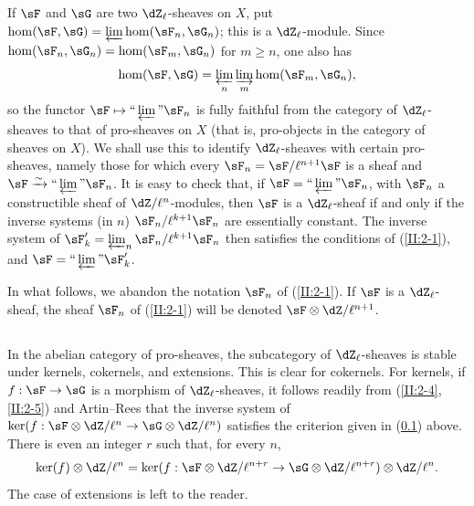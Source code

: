 \documentclass[12pt,oneside,english]{smfbook}
\newcommand{\iso}{\xrightarrow\sim}
\begin{document}
\subsection{}\label{II:2-6}

If $\sF$ and $\sG$ are two $\dZ_\ell$-sheaves on $X$, put $\hom(\sF,\sG)=\varprojlim\hom(\sF_n,\sG_n)$; this is a $\dZ_\ell$-module. Since $\hom(\sF_n,\sG_n)=\hom(\sF_m,\sG_n)$ for $m\geqslant n$, one also has
\[
  \hom(\sF,\sG) = \varprojlim_n \varinjlim_m \hom(\sF_m,\sG_n) \text{,}
\]
so the functor $\sF\mapsto\text{``}\varprojlim\text{''}\sF_n$ is fully faithful from the category of $\dZ_\ell$-sheaves to that of pro-sheaves on $X$ (that is, pro-objects in the category of sheaves on $X$). We shall use this to identify $\dZ_\ell$-sheaves with certain pro-sheaves, namely those for which every $\sF_n=\sF/\ell^{n+1}\sF$ is a sheaf and $\sF\iso\text{``}\varprojlim\text{''}\sF_n$. It is easy to check that, if $\sF=\text{``}\varprojlim\text{''}\sF_n$, with $\sF_n$ a constructible sheaf of $\dZ/\ell^n$-modules, then $\sF$ is a $\dZ_\ell$-sheaf if and only if the inverse systems (in $n$) $\sF_n/\ell^{k+1}\sF_n$ are essentially constant. The inverse system of $\sF'_k=\varprojlim_n\sF_n/\ell^{k+1}\sF_n$ then satisfies the conditions of (\ref{II:2-1}), and $\sF=\text{``}\varprojlim\text{''}\sF'_k$.

In what follows, we abandon the notation $\sF_n$ of (\ref{II:2-1}). If $\sF$ is a $\dZ_\ell$-sheaf, the sheaf $\sF_n$ of (\ref{II:2-1}) will be denoted $\sF\otimes\dZ/\ell^{n+1}$.

\subsection{}\label{II:2-7}

In the abelian category of pro-sheaves, the subcategory of $\dZ_\ell$-sheaves is stable under kernels, cokernels, and extensions. This is clear for cokernels. For kernels, if $f:\sF\to\sG$ is a morphism of $\dZ_\ell$-sheaves, it follows readily from (\ref{II:2-4}, \ref{II:2-5}) and Artin--Rees that the inverse system of $\ker(f:\sF\otimes\dZ/\ell^n\to\sG\otimes\dZ/\ell^n)$ satisfies the criterion given in (\ref{II:2-6}) above. There is even an integer $r$ such that, for every $n$,
\[
  \ker(f)\otimes\dZ/\ell^n = \ker(f:\sF\otimes\dZ/\ell^{n+r}\to\sG\otimes\dZ/\ell^{n+r})\otimes\dZ/\ell^n \text{.}
\]
The case of extensions is left to the reader.

\subsection{}\label{II:2-8}
\end{document}
